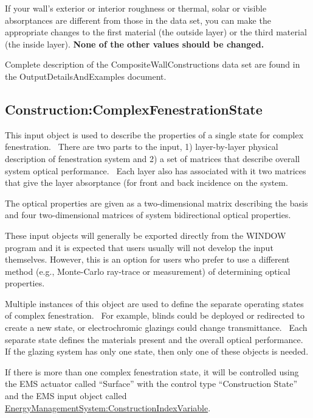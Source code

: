 If your wall's exterior or interior roughness or thermal, solar or visible absorptances are different from those in the data set, you can make the appropriate changes to the first material (the outside layer) or the third material (the inside layer). \textbf{None of the other values should be changed.}

\begin{callout}
Complete description of the CompositeWallConstructions data set are found in the OutputDetailsAndExamples document.
\end{callout}

\subsection{Construction:ComplexFenestrationState}\label{constructioncomplexfenestrationstate}

This input object is used to describe the properties of a single state for complex fenestration.~ There are two parts to the input, 1) layer-by-layer physical description of fenestration system and 2) a set of matrices that describe overall system optical performance.~ Each layer also has associated with it two matrices that give the layer absorptance (for front and back incidence on the system.

The optical properties are given as a two-dimensional matrix describing the basis and four two-dimensional matrices of system bidirectional optical properties.

These input objects will generally be exported directly from the WINDOW program and it is expected that users usually will not develop the input themselves. However, this is an option for users who prefer to use a different method (e.g., Monte-Carlo ray-trace or measurement) of determining optical properties.

Multiple instances of this object are used to define the separate operating states of complex fenestration.~ For example, blinds could be deployed or redirected to create a new state, or electrochromic glazings could change transmittance.~ Each separate state defines the materials present and the overall optical performance.~ If the glazing system has only one state, then only one of these objects is needed.

If there is more than one complex fenestration state, it will be controlled using the EMS actuator called ``Surface'' with the control type ``Construction State'' and the EMS input object called \hyperref[energymanagementsystemconstructionindexvariable]{EnergyManagementSystem:ConstructionIndexVariable}.

